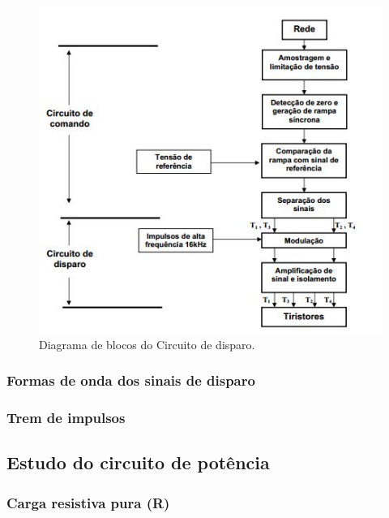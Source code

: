 \documentclass[a4paper,11pt]{article}
\numberwithin{equation}{section}
\begin{document}
\begin{figure}[h]
	\centering
	\includegraphics[keepaspectratio=true, scale=0.8]{teoricas/circuito_disparo.jpg}
	\caption{Diagrama de blocos do Circuito de disparo.}
	\label{fig:circuit_1}
	\vspace{-0.8em}
\end{figure}

\subsubsection{Formas de onda dos sinais de disparo}



\subsubsection{Trem de impulsos}


\subsection{Estudo do circuito de potência}

\subsubsection{Carga resistiva pura (R)}
\end{document}
